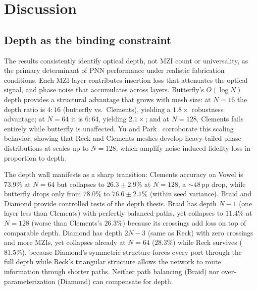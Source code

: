 \documentclass[11pt,a4paper]{article}
\begin{document}
\section{Discussion}
\label{sec:discussion}

\subsection{Depth as the binding constraint}

The results consistently identify optical depth, not MZI count or
universality, as the primary determinant of PNN performance under realistic
fabrication conditions.  Each MZI layer contributes insertion loss that
attenuates the optical signal, and phase noise that accumulates across layers.
Butterfly's $O(\log N)$ depth provides a structural advantage that grows with
mesh size: at $N{=}16$ the depth ratio is $4{:}16$ (butterfly vs.\ Clements),
yielding a $1.8\times$ robustness advantage; at $N{=}64$ it is $6{:}64$, yielding
$2.1\times$; and at $N{=}128$, Clements fails entirely while butterfly is
unaffected.
Yu and Park~\cite{yu2023} corroborate this scaling behavior, showing that Reck
and Clements meshes develop heavy-tailed phase distributions at scales up to
$N{=}128$, which amplify noise-induced fidelity loss in proportion to depth.

The depth wall manifests as a sharp transition: Clements accuracy on Vowel is
73.9\% at $N{=}64$ but collapses to $26.3 \pm 2.9$\% at $N{=}128$, a ${\sim}48$\,pp
drop, while butterfly drops only from 78.0\% to $76.6 \pm 2.1$\% (within seed variance).
Braid and Diamond provide controlled tests of the depth thesis.  Braid has
depth $N{-}1$ (one layer less than Clements) with perfectly balanced paths,
yet collapses to $11.4$\% at $N{=}128$ (worse than Clements's $26.3$\%)
because its crossings add loss on top of comparable depth.  Diamond has depth
$2N{-}3$ (same as Reck) with zero crossings and more MZIs, yet collapses
already at $N{=}64$ ($28.3$\%) while Reck survives ($81.5$\%), because
Diamond's symmetric structure forces every port through the full depth while
Reck's triangular structure allows the network to route information through
shorter paths.  Neither path balancing (Braid) nor over-parameterization
(Diamond) can compensate for depth.
\end{document}
